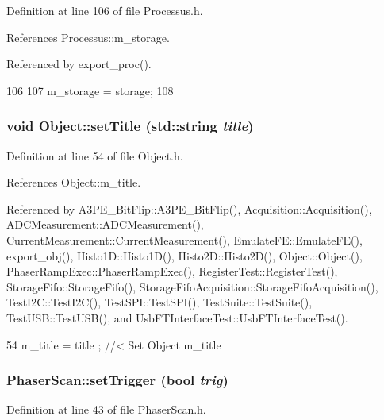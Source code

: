 Definition at line 106 of file Processus.h.

References Processus::m\_\-storage.

Referenced by export\_\-proc().


\begin{DoxyCode}
106                                       {
107     m_storage = storage;
108   }
\end{DoxyCode}
\hypertarget{classObject_a89557dbbad5bcaa02652f5d7fa35d20f}{
\subsubsection[{setTitle}]{\setlength{\rightskip}{0pt plus 5cm}void Object::setTitle (std::string {\em title})}}
\label{classObject_a89557dbbad5bcaa02652f5d7fa35d20f}


Definition at line 54 of file Object.h.

References Object::m\_\-title.

Referenced by A3PE\_\-BitFlip::A3PE\_\-BitFlip(), Acquisition::Acquisition(), ADCMeasurement::ADCMeasurement(), CurrentMeasurement::CurrentMeasurement(), EmulateFE::EmulateFE(), export\_\-obj(), Histo1D::Histo1D(), Histo2D::Histo2D(), Object::Object(), PhaserRampExec::PhaserRampExec(), RegisterTest::RegisterTest(), StorageFifo::StorageFifo(), StorageFifoAcquisition::StorageFifoAcquisition(), TestI2C::TestI2C(), TestSPI::TestSPI(), TestSuite::TestSuite(), TestUSB::TestUSB(), and UsbFTInterfaceTest::UsbFTInterfaceTest().


\begin{DoxyCode}
54 { m_title = title ; } //< Set Object m_title
\end{DoxyCode}
\hypertarget{classPhaserScan_a8e9d2bff400546f71d0c24cd3658d09e}{
\subsubsection[{setTrigger}]{ PhaserScan::setTrigger (bool {\em trig})}}
\label{classPhaserScan_a8e9d2bff400546f71d0c24cd3658d09e}


Definition at line 43 of file PhaserScan.h.

